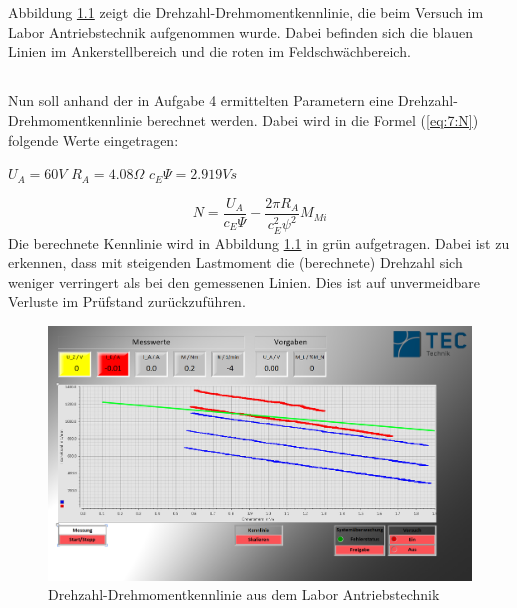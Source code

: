 \chapter{}

\section{}

Abbildung \ref{fig:7:kennlinie} zeigt die Drehzahl-Drehmomentkennlinie, die beim Versuch im Labor Antriebstechnik aufgenommen wurde. Dabei befinden sich die blauen Linien im Ankerstellbereich und die roten im Feldschwächbereich.

\section{}
Nun soll anhand der in Aufgabe 4 ermittelten Parametern eine Drehzahl-Drehmomentkennlinie berechnet werden. Dabei wird in die Formel (\ref{eq:7:N}) folgende Werte eingetragen:
\begin{center}
	$ U_{A} = 60V $ \hspace{1.5cm}	$ R_{A} = 4.08\Omega $ \hspace{1.5cm}	$ c_{E}\Psi = 2.919Vs$
\end{center}
\begin{equation}
	N = \frac{U_{A}}{c_{E}\Psi} - \frac{2\pi R_{A}}{c_{E}^{2}\psi^{2}}M_{Mi}
	\label{eq:7:N}
\end{equation}
Die berechnete Kennlinie wird in Abbildung \ref{fig:7:kennlinie} in grün aufgetragen. Dabei ist zu erkennen, dass mit steigenden Lastmoment die (berechnete) Drehzahl sich weniger verringert als bei den gemessenen Linien. Dies ist auf unvermeidbare Verluste im Prüfstand zurückzuführen.

\begin{figure}[h]
	\centering 
	\includegraphics[width=\textwidth]{./bilder/kennlinie.png}
	\caption{Drehzahl-Drehmomentkennlinie aus dem Labor Antriebstechnik}
	\label{fig:7:kennlinie}
\end{figure}